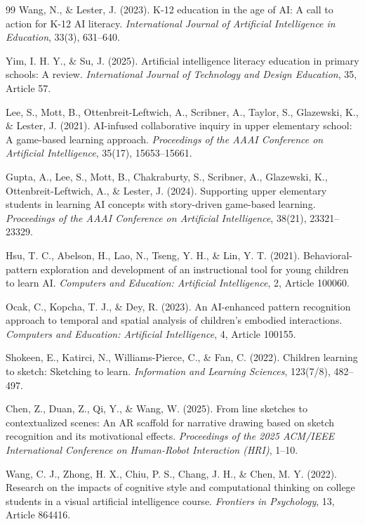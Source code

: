 \documentclass[12pt,a4paper,oneside,openany]{report}
\begin{document}
\begin{thebibliography}{99}
Wang, N., \& Lester, J. (2023). K-12 education in the age of AI: A call to action for K-12 AI literacy. \textit{International Journal of Artificial Intelligence in Education}, 33(3), 631--640.

Yim, I. H. Y., \& Su, J. (2025). Artificial intelligence literacy education in primary schools: A review. \textit{International Journal of Technology and Design Education}, 35, Article 57.

Lee, S., Mott, B., Ottenbreit-Leftwich, A., Scribner, A., Taylor, S., Glazewski, K., \& Lester, J. (2021). AI-infused collaborative inquiry in upper elementary school: A game-based learning approach. \textit{Proceedings of the AAAI Conference on Artificial Intelligence}, 35(17), 15653--15661.

Gupta, A., Lee, S., Mott, B., Chakraburty, S., Scribner, A., Glazewski, K., Ottenbreit-Leftwich, A., \& Lester, J. (2024). Supporting upper elementary students in learning AI concepts with story-driven game-based learning. \textit{Proceedings of the AAAI Conference on Artificial Intelligence}, 38(21), 23321--23329.

Hsu, T. C., Abelson, H., Lao, N., Tseng, Y. H., \& Lin, Y. T. (2021). Behavioral-pattern exploration and development of an instructional tool for young children to learn AI. \textit{Computers and Education: Artificial Intelligence}, 2, Article 100060.

Ocak, C., Kopcha, T. J., \& Dey, R. (2023). An AI-enhanced pattern recognition approach to temporal and spatial analysis of children's embodied interactions. \textit{Computers and Education: Artificial Intelligence}, 4, Article 100155.

Shokeen, E., Katirci, N., Williams-Pierce, C., \& Fan, C. (2022). Children learning to sketch: Sketching to learn. \textit{Information and Learning Sciences}, 123(7/8), 482--497.

Chen, Z., Duan, Z., Qi, Y., \& Wang, W. (2025). From line sketches to contextualized scenes: An AR scaffold for narrative drawing based on sketch recognition and its motivational effects. \textit{Proceedings of the 2025 ACM/IEEE International Conference on Human-Robot Interaction (HRI)}, 1--10.

Wang, C. J., Zhong, H. X., Chiu, P. S., Chang, J. H., \& Chen, M. Y. (2022). Research on the impacts of cognitive style and computational thinking on college students in a visual artificial intelligence course. \textit{Frontiers in Psychology}, 13, Article 864416.


\end{thebibliography}
\end{document}
